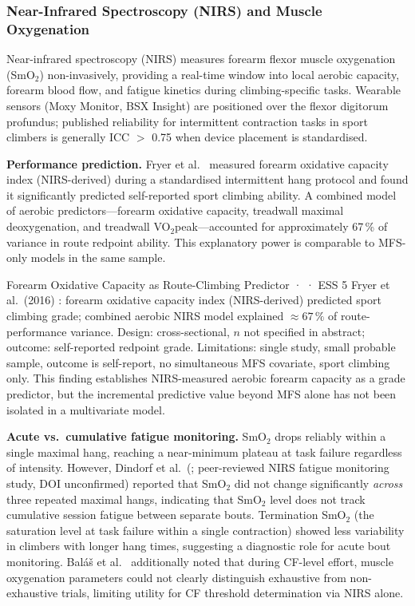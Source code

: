 \subsubsection{Near-Infrared Spectroscopy (NIRS) and Muscle Oxygenation}

Near-infrared spectroscopy (NIRS) measures forearm flexor muscle oxygenation (SmO$_2$) non-invasively, providing a real-time window into local aerobic capacity, forearm blood flow, and fatigue kinetics during climbing-specific tasks.
Wearable sensors (Moxy Monitor, BSX Insight) are positioned over the flexor digitorum profundus; published reliability for intermittent contraction tasks in sport climbers is generally ICC $>$ 0.75 when device placement is standardised.

\medskip
\noindent\textbf{Performance prediction.}
Fryer et al.\ \cite{FSS+16} measured forearm oxidative capacity index (NIRS-derived) during a standardised intermittent hang protocol and found it significantly predicted self-reported sport climbing ability.
A combined model of aerobic predictors---forearm oxidative capacity, treadwall maximal deoxygenation, and treadwall VO$_2$peak---accounted for approximately 67\,\% of variance in route redpoint ability.
This explanatory power is comparable to MFS-only models in the same sample.

\begin{evidencebox}{Forearm Oxidative Capacity as Route-Climbing Predictor · \evidencebacked · ESS 5}
Fryer et al.\ (2016) \cite{FSS+16}: forearm oxidative capacity index (NIRS-derived) predicted sport climbing grade; combined aerobic NIRS model explained ${\approx}67\,\%$ of route-performance variance.
Design: cross-sectional, $n$ not specified in abstract; outcome: self-reported redpoint grade.
Limitations: single study, small probable sample, outcome is self-report, no simultaneous MFS covariate, sport climbing only.
This finding establishes NIRS-measured aerobic forearm capacity as a grade predictor, but the incremental predictive value beyond MFS alone has not been isolated in a multivariate model.
\end{evidencebox}

\medskip
\noindent\textbf{Acute vs.\ cumulative fatigue monitoring.}
SmO$_2$ drops reliably within a single maximal hang, reaching a near-minimum plateau at task failure regardless of intensity.
However, Dindorf et al.\ (\toverify; peer-reviewed NIRS fatigue monitoring study, DOI unconfirmed) reported that SmO$_2$ did not change significantly \emph{across} three repeated maximal hangs, indicating that SmO$_2$ level does not track cumulative session fatigue between separate bouts.
Termination SmO$_2$ (the saturation level at task failure within a single contraction) showed less variability in climbers with longer hang times, suggesting a diagnostic role for acute bout monitoring.
Baláš et al.\ \cite{BGJ+24} additionally noted that during CF-level effort, muscle oxygenation parameters could not clearly distinguish exhaustive from non-exhaustive trials, limiting utility for CF threshold determination via NIRS alone.

